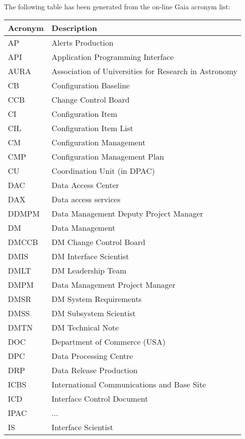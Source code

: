 The following table has been generated from the on-line Gaia acronym list:
\newline\newline%
\addtocounter{table}{-1}
\begin{longtable}{|l|p{}|}\hline 
\textbf{Acronym} & \textbf{Description}  \\\hline
AP&Alerts Production \\\hline
API&Application Programming Interface \\\hline
AURA&Association of Universities for Research in Astronomy \\\hline
CB&Configuration Baseline \\\hline
CCB&Change Control Board \\\hline
CI&Configuration Item \\\hline
CIL&Configuration Item List \\\hline
CM&Configuration Management \\\hline
CMP&Configuration Management Plan \\\hline
CU&Coordination Unit (in DPAC) \\\hline
DAC&Data Access Center \\\hline
DAX&Data access services \\\hline
DDMPM&Data Management Deputy Project Manager \\\hline
DM&Data Management \\\hline
DMCCB&DM Change Control Board \\\hline
DMIS&DM Interface Scientist \\\hline
DMLT&DM Leadership Team \\\hline
DMPM&Data Management Project Manager \\\hline
DMSR&DM System Requirements \\\hline
DMSS&DM Subsystem Scientist \\\hline
DMTN&DM Technical Note \\\hline
DOC&Department of Commerce (USA) \\\hline
DPC&Data Processing Centre \\\hline
DRP&Data Release Production \\\hline
ICBS&International Communications and Base Site \\\hline
ICD&Interface Control Document \\\hline
IPAC&... \\\hline
IS&Interface Scientist \\\hline

\end{longtable}
